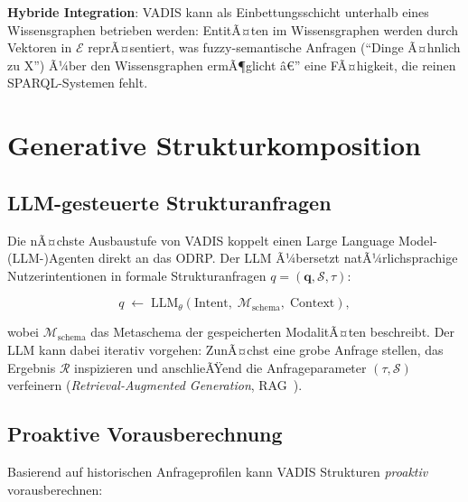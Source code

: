 ﻿\documentclass[12pt,a4paper]{article}
\begin{document}
\textbf{Hybride Integration}: VADIS kann als Einbettungsschicht
unterhalb eines Wissensgraphen betrieben werden: EntitÃ¤ten im
Wissensgraphen werden durch Vektoren in $\mathcal{E}$ reprÃ¤sentiert,
was fuzzy-semantische Anfragen (``Dinge Ã¤hnlich zu X'')
Ã¼ber den Wissensgraphen ermÃ¶glicht â€” eine FÃ¤higkeit, die reinen
SPARQL-Systemen fehlt.

\section{Generative Strukturkomposition}
\label{sec:generativ}

\subsection{LLM-gesteuerte Strukturanfragen}

Die nÃ¤chste Ausbaustufe von VADIS koppelt einen
Large Language Model-(LLM-)Agenten direkt an das ODRP.
Der LLM Ã¼bersetzt natÃ¼rlichsprachige Nutzerintentionen in
formale Strukturanfragen $q = (\mathbf{q}, \mathcal{S}, \tau)$:

\begin{equation}
  q \;\gets\; \text{LLM}_\theta\!\left(
    \text{Intent},\; \mathcal{M}_{\text{schema}},\; \text{Context}
  \right),
\end{equation}

wobei $\mathcal{M}_{\text{schema}}$ das Metaschema der gespeicherten
ModalitÃ¤ten beschreibt. Der LLM kann dabei iterativ vorgehen:
ZunÃ¤chst eine grobe Anfrage stellen, das Ergebnis $\mathcal{R}$
inspizieren und anschlieÃŸend die Anfrageparameter $(\tau, \mathcal{S})$
verfeinern (\emph{Retrieval-Augmented Generation}, RAG~\cite{lewis2020rag}).

\subsection{Proaktive Vorausberechnung}

Basierend auf historischen Anfrageprofilen kann VADIS
Strukturen \emph{proaktiv} vorausberechnen:
\end{document}
